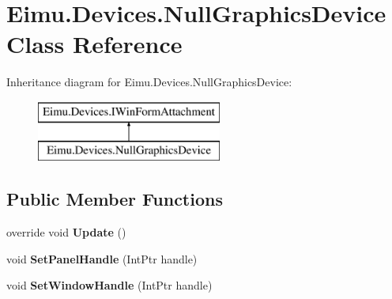 \hypertarget{class_eimu_1_1_devices_1_1_null_graphics_device}{
\section{Eimu.Devices.NullGraphicsDevice Class Reference}
\label{class_eimu_1_1_devices_1_1_null_graphics_device}
}
Inheritance diagram for Eimu.Devices.NullGraphicsDevice:\begin{figure}[H]
\begin{center}
\leavevmode
\includegraphics[height=2.000000cm]{class_eimu_1_1_devices_1_1_null_graphics_device}
\end{center}
\end{figure}
\subsection*{Public Member Functions}
\begin{DoxyCompactItemize}
\item 
\hypertarget{class_eimu_1_1_devices_1_1_null_graphics_device_aece3ecd93c75846decb2e94412c0c1ae}{
override void {\bfseries Update} ()}
\label{class_eimu_1_1_devices_1_1_null_graphics_device_aece3ecd93c75846decb2e94412c0c1ae}

\item 
\hypertarget{class_eimu_1_1_devices_1_1_null_graphics_device_a34ee0336ca05f1a556aa8c8979a581e5}{
void {\bfseries SetPanelHandle} (IntPtr handle)}
\label{class_eimu_1_1_devices_1_1_null_graphics_device_a34ee0336ca05f1a556aa8c8979a581e5}

\item 
\hypertarget{class_eimu_1_1_devices_1_1_null_graphics_device_ab38e0c0c2afadde3c00ab776253495c1}{
void {\bfseries SetWindowHandle} (IntPtr handle)}
\label{class_eimu_1_1_devices_1_1_null_graphics_device_ab38e0c0c2afadde3c00ab776253495c1}

\end{DoxyCompactItemize}
